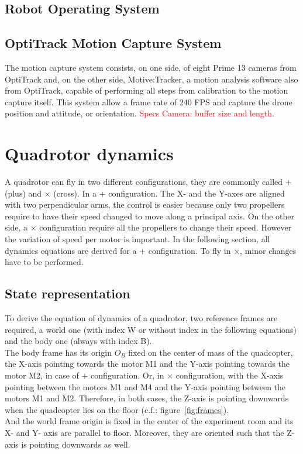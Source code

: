 \documentclass[a4paper, 12pt]{report}
\begin{document}
\subsection{Robot Operating System}


\subsection{OptiTrack Motion Capture System}
The motion capture system consists, on one side, of eight Prime 13 cameras from OptiTrack and, on the other side, Motive:Tracker, a motion analysis software also from OptiTrack, capable of performing all steps from calibration to the motion capture itself.
This system allow a frame rate of 240 FPS and capture the drone position and attitude, or orientation. \textcolor{red}{Specs Camera: buffer size and length}.

\newpage
\section{Quadrotor dynamics}
A quadrotor can fly in two different configurations, they are commonly called $+$ (plus) and $\times$ (cross). In a $+$ configuration. The X- and the Y-axes are aligned with two perpendicular arms, the control is easier because only two propellers require to have their speed changed to move along a principal axis. On the other side, a $\times$ configuration require all the propellers to change their speed. However the variation of speed per motor is important. In the following section, all dynamics equations are derived for a $+$ configuration. To fly in $\times$, minor changes have to be performed.

\subsection{State representation}
To derive the equation of dynamics of a quadrotor, two reference frames are required, a world one (with index W or without index in the following equations) and the body one (always with index B).\\
 The body frame has its origin $O_B$ fixed on the center of mass of the quadcopter, the X-axis pointing towards the motor M1 and the Y-axis pointing towards the motor M2, in case of $+$ configuration. Or, in $\times$ configuration, with the X-axis pointing between the motors M1 and M4 and the Y-axis pointing between the motors M1 and M2. Therefore, in both cases, the Z-axis is pointing downwards when the quadcopter lies on the floor (c.f.: figure~\ref{fig:frames}). \\
And the world frame origin is fixed in the center of the experiment room and its X- and Y- axis are parallel to floor. Moreover, they are oriented such that the Z-axis is pointing downwards as well. 
\end{document}
